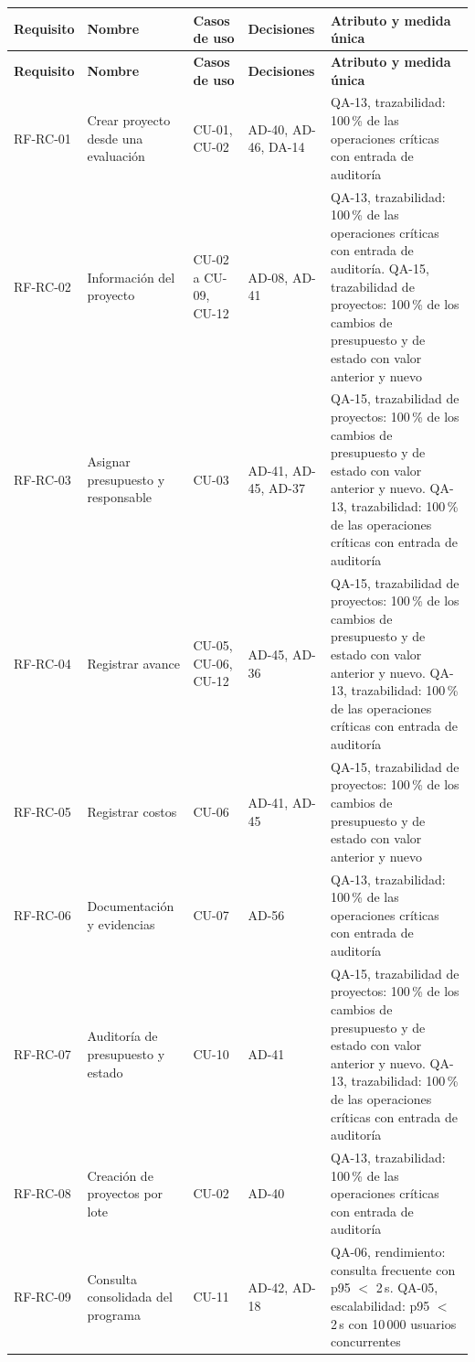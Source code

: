 \documentclass[11pt,a4paper]{article}
\begin{document}
\begin{center}\small
\begin{longtable}{|P{1.7cm}|P{2.9cm}|P{1.7cm}|P{1.9cm}|P{6.0cm}|}
  \hline
  \textbf{Requisito} & \textbf{Nombre} & \textbf{Casos de uso} & \textbf{Decisiones} & \textbf{Atributo y medida única} \\ \hline
  \endfirsthead
  \hline
  \textbf{Requisito} & \textbf{Nombre} & \textbf{Casos de uso} & \textbf{Decisiones} & \textbf{Atributo y medida única} \\ \hline
  \endhead
  RF-RC-01 & Crear proyecto desde una evaluación & CU-01, CU-02 & AD-40, AD-46, DA-14 & QA-13, trazabilidad: 100\,\% de las operaciones críticas con entrada de auditoría \\ \hline
  RF-RC-02 & Información del proyecto & CU-02 a CU-09, CU-12 & AD-08, AD-41 & QA-13, trazabilidad: 100\,\% de las operaciones críticas con entrada de auditoría. QA-15, trazabilidad de proyectos: 100\,\% de los cambios de presupuesto y de estado con valor anterior y nuevo \\ \hline
  RF-RC-03 & Asignar presupuesto y responsable & CU-03 & AD-41, AD-45, AD-37 & QA-15, trazabilidad de proyectos: 100\,\% de los cambios de presupuesto y de estado con valor anterior y nuevo. QA-13, trazabilidad: 100\,\% de las operaciones críticas con entrada de auditoría \\ \hline
  RF-RC-04 & Registrar avance & CU-05, CU-06, CU-12 & AD-45, AD-36 & QA-15, trazabilidad de proyectos: 100\,\% de los cambios de presupuesto y de estado con valor anterior y nuevo. QA-13, trazabilidad: 100\,\% de las operaciones críticas con entrada de auditoría \\ \hline
  RF-RC-05 & Registrar costos & CU-06 & AD-41, AD-45 & QA-15, trazabilidad de proyectos: 100\,\% de los cambios de presupuesto y de estado con valor anterior y nuevo \\ \hline
  RF-RC-06 & Documentación y evidencias & CU-07 & AD-56 & QA-13, trazabilidad: 100\,\% de las operaciones críticas con entrada de auditoría \\ \hline
  RF-RC-07 & Auditoría de presupuesto y estado & CU-10 & AD-41 & QA-15, trazabilidad de proyectos: 100\,\% de los cambios de presupuesto y de estado con valor anterior y nuevo. QA-13, trazabilidad: 100\,\% de las operaciones críticas con entrada de auditoría \\ \hline
  RF-RC-08 & Creación de proyectos por lote & CU-02 & AD-40 & QA-13, trazabilidad: 100\,\% de las operaciones críticas con entrada de auditoría \\ \hline
  RF-RC-09 & Consulta consolidada del programa & CU-11 & AD-42, AD-18 & QA-06, rendimiento: consulta frecuente con p95 $<$ 2\,s. QA-05, escalabilidad: p95 $<$ 2\,s con 10\,000 usuarios concurrentes \\ \hline
\end{longtable}
\end{center}
\end{document}
